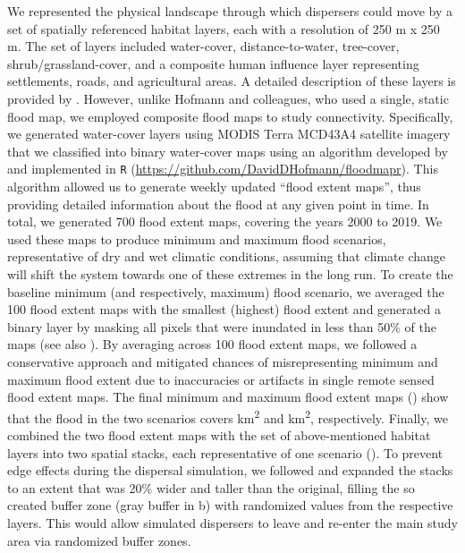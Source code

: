 \documentclass[../FinalThesis.tex]{subfiles}
\begin{document}
We represented the physical landscape through which dispersers could move by a
set of spatially referenced habitat layers, each with a resolution of 250 m x
250 m. The set of layers included \textsf{water-cover, distance-to-water,
tree-cover, shrub/grassland-cover}, and a composite \textsf{human influence}
layer representing settlements, roads, and agricultural areas. A detailed
description of these layers is provided by \citet{Hofmann.2021}. However, unlike
Hofmann and colleagues, who used a single, static flood map, we employed
composite flood maps to study connectivity. Specifically, we generated
water-cover layers using MODIS Terra MCD43A4 satellite imagery that we
classified into binary water-cover maps using an algorithm developed by
\citet{Wolski.2017} and implemented in \texttt{R}
(\url{https://github.com/DavidDHofmann/floodmapr}). This algorithm allowed us to
generate weekly updated ``flood extent maps'', thus providing detailed
information about the flood at any given point in time. In total, we generated
700 flood extent maps, covering the years 2000 to 2019. We used these maps to
produce minimum and maximum flood scenarios, representative of dry and wet
climatic conditions, assuming that climate change will shift the system towards
one of these extremes in the long run. To create the baseline minimum (and
respectively, maximum) flood scenario, we averaged the 100 flood extent maps
with the smallest (highest) flood extent and generated a binary layer by masking
all pixels that were inundated in less than 50\% of the maps (see also
). By averaging across 100 flood extent maps, we followed a
conservative approach and mitigated chances of misrepresenting minimum and
maximum flood extent due to inaccuracies or artifacts in single remote sensed
flood extent maps. The final minimum and maximum flood extent maps
() show that the flood in the two scenarios covers
 km\textsuperscript{2} and
 km\textsuperscript{2}, respectively.
Finally, we combined the two flood extent maps with the set of above-mentioned
habitat layers into two spatial stacks, each representative of one scenario
(). To prevent edge effects during the dispersal simulation, we
followed \citet{Koen.2010} and expanded the stacks to an extent that was 20\%
wider and taller than the original, filling the so created buffer zone (gray
buffer in b) with randomized values from the respective
layers. This would allow simulated dispersers to leave and re-enter the main
study area via randomized buffer zones.
\end{document}
